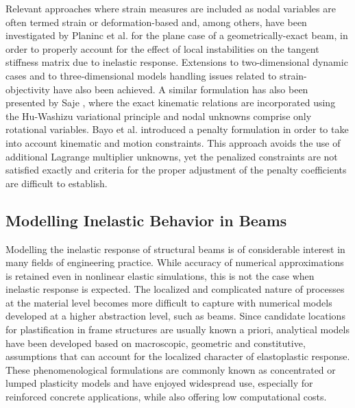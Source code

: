 Relevant approaches where strain measures are included as nodal variables are often
termed strain or deformation-based and, among others, have been
investigated by Planinc
et al. \cite{Planinc} for the plane case of a geometrically-exact beam, in
order to properly account for the effect of local instabilities on the tangent
stiffness matrix due to inelastic response. Extensions to two-dimensional
dynamic cases \cite{Gems} and to three-dimensional models \cite{Zupan}
handling issues related to strain-objectivity have also been
achieved. A similar formulation has also been presented by Saje \cite{Saje1},
where the exact kinematic relations are incorporated using the Hu-Washizu variational
principle and nodal unknowns comprise only rotational variables. Bayo et al.
\cite{Bayo} introduced a penalty formulation in order to take into account
kinematic and motion constraints. This approach avoids the use of additional
Lagrange multiplier unknowns, yet the penalized constraints are not
satisfied exactly and criteria for the proper adjustment of the penalty
coefficients are difficult to establish.

\subsection{Modelling Inelastic Behavior in Beams}

Modelling the inelastic response of structural beams is of considerable
interest in many fields of engineering practice. While accuracy of
numerical approximations is retained even in nonlinear elastic 
simulations, this is not the case when inelastic response is expected. The 
localized and complicated nature of processes at the material level 
becomes more difficult to capture with numerical models developed at a 
higher abstraction level, such as beams. Since candidate locations for 
plastification in frame structures are usually known a priori, 
analytical models have been developed based on macroscopic, geometric and 
constitutive, assumptions that can account for the localized character of
elastoplastic response. These phenomenological formulations are commonly known
as concentrated or lumped plasticity models and have 
enjoyed widespread use, especially for reinforced concrete applications, 
while also offering low computational costs.  

